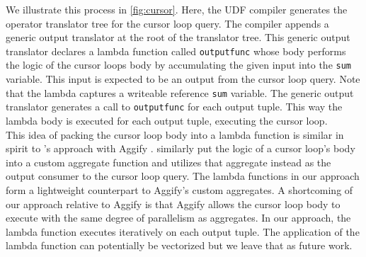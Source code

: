 \documentclass[12pt]{cmuthesis}
\newcommand{\sysname}{NoisePage\xspace}
\begin{document}
We illustrate this process in \cref{fig:cursor}. Here, the UDF compiler generates the operator translator tree for the cursor loop query. The compiler appends a generic output translator at the root of the translator tree. This generic output translator declares a lambda function called \texttt{outputfunc} whose body performs the logic of the cursor loops body by accumulating the given input into the \texttt{sum} variable. This input is expected to be an output from the cursor loop query. Note that the lambda captures a writeable reference \texttt{sum} variable. The generic output translator generates a call to \texttt{outputfunc} for each output tuple. This way the lambda body is executed for each output tuple, executing the cursor loop.\\

This idea of packing the cursor loop body into a lambda function is similar in spirit to \citeauthor{gupta20}'s approach with Aggify \cite{gupta20}. \citeauthor{gupta20} similarly put the logic of a cursor loop's body into a custom aggregate function and utilizes that aggregate instead as the output consumer to the cursor loop query. The lambda functions in our approach form a lightweight counterpart to Aggify's custom aggregates. A shortcoming of our approach relative to Aggify is that Aggify allows the cursor loop body to execute with the same degree of parallelism as aggregates. In our approach, the lambda function executes iteratively on each output tuple. The application of the lambda function can potentially be vectorized but we leave that as future work.  

    
\end{document}

